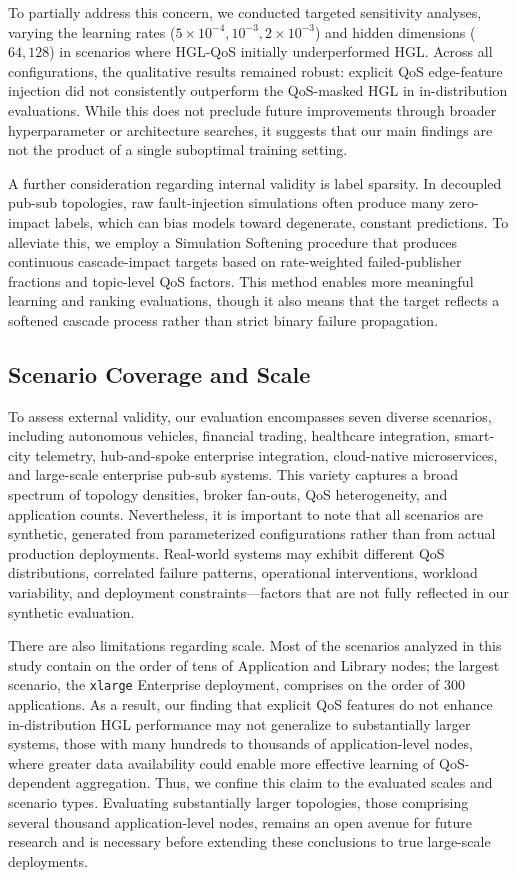 \documentclass[sigconf,9pt,anonymous]{acmart}
\begin{document}
To partially address this concern, we conducted targeted sensitivity analyses, varying the learning rates (${5\times10^{-4}, 10^{-3}, 2\times10^{-3}}$) and hidden dimensions (${64, 128}$) in scenarios where HGL-QoS initially underperformed HGL. Across all configurations, the qualitative results remained robust: explicit QoS edge-feature injection did not consistently outperform the QoS-masked HGL in in-distribution evaluations. While this does not preclude future improvements through broader hyperparameter or architecture searches, it suggests that our main findings are not the product of a single suboptimal training setting.

A further consideration regarding internal validity is label sparsity. In decoupled pub-sub topologies, raw fault-injection simulations often produce many zero-impact labels, which can bias models toward degenerate, constant predictions. To alleviate this, we employ a Simulation Softening procedure that produces continuous cascade-impact targets based on rate-weighted failed-publisher fractions and topic-level QoS factors. This method enables more meaningful learning and ranking evaluations, though it also means that the target reflects a softened cascade process rather than strict binary failure propagation.

\subsection{Scenario Coverage and Scale}

To assess external validity, our evaluation encompasses seven diverse scenarios, including autonomous vehicles, financial trading, healthcare integration, smart-city telemetry, hub-and-spoke enterprise integration, cloud-native microservices, and large-scale enterprise pub-sub systems. This variety captures a broad spectrum of topology densities, broker fan-outs, QoS heterogeneity, and application counts. Nevertheless, it is important to note that all scenarios are synthetic, generated from parameterized configurations rather than from actual production deployments. Real-world systems may exhibit different QoS distributions, correlated failure patterns, operational interventions, workload variability, and deployment constraints—factors that are not fully reflected in our synthetic evaluation.

There are also limitations regarding scale. Most of the scenarios analyzed in this study contain on the order of tens of Application and Library nodes; the largest scenario, the \texttt{xlarge} Enterprise deployment, comprises on the order of 300 applications. As a result, our finding that explicit QoS features do not enhance in-distribution HGL performance may not generalize to substantially larger systems, those with many hundreds to thousands of application-level nodes, where greater data availability could enable more effective learning of QoS-dependent aggregation. Thus, we confine this claim to the evaluated scales and scenario types. Evaluating substantially larger topologies, those comprising several thousand application-level nodes, remains an open avenue for future research and is necessary before extending these conclusions to true large-scale deployments.
\end{document}
